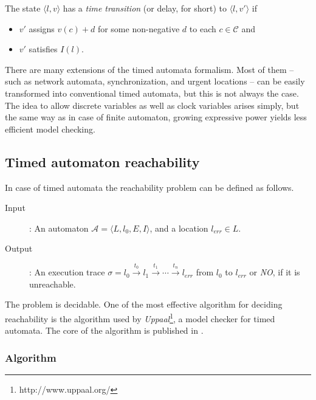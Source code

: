 \begin{dfn}
The state $\langle l,v \rangle$ has a \emph{time transition} (or delay, for short) to $\langle l,v' \rangle$ if
\begin{itemize}
	\item $v'$ assigns $v(c)+d$ for some non-negative $d$ to each $c \in \mathcal{C}$ and
	\item $v'$ satisfies $I(l)$. 
\end{itemize}
\end{dfn}

\begin{example}
\end{example}

There are many extensions of the timed automata formalism. Most of them -- such as network automata, synchronization, and urgent locations -- can be easily transformed into conventional timed automata, but this is not always the case. The idea to allow discrete variables as well as clock variables arises simply, but the same way as in case of finite automaton, growing expressive power yields less efficient model checking.


\subsection{Timed automaton reachability} \label{sec:tareach}

In case of timed automata the reachability problem can be defined as follows.

\begin{description}
	\item [Input]: An automaton $\mathcal{A}=\langle L, l_0,
	E, I\rangle$, and a location $l_{err} \in L$.
	\item[Output]: An execution trace $\sigma=l_0 \xrightarrow{t_0} l_1 \xrightarrow{t_1} \cdots \xrightarrow{t_n} l_{err}$ from $l_0$ to $l_{err}$ or \emph{NO}, if it is unreachable.
\end{description}

The problem is decidable. One of the most effective algorithm for deciding reachability is the algorithm used by \emph{Uppaal}\footnote{http://www.uppaal.org/}, a model checker for timed automata. The core of the algorithm is published in \cite{bengtsson2004timed}.
\subsubsection{Algorithm}

